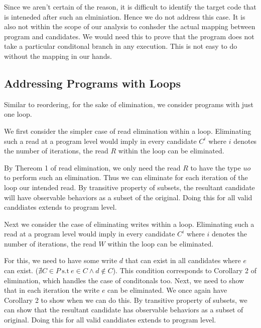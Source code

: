         Since we aren't certain of the reason, it is difficult to identify the target code that is inteneded after such an elminiation. Hence we do not address this case. It is also not within the scope of our analysis to conhsder the actual mapping between program and candidates. We would need this to prove that the program does not take a particular conditonal branch in any execution. This is not easy to do without the mapping in our hands. 


    \subsection{Addressing Programs with Loops}
    
        Similar to reordering, for the sake of elimination, we consider programs with just one loop. 
        
        We first consider the simpler case of read elimination within a loop. 
        Eliminating such a read at a program level would imply in every candidate $C^i$ where $i$ denotes the number of iterations, the read $R$ within the loop can be eliminated.
        
        By Thereom 1 of read elimination, we only need the read $R$ to have the type $uo$ to perform such an elimination.
        Thus we can eliminate for each iteration of the loop our intended read. 
        By transitive property of subsets, the resultant candidate will have observable behaviors as a subset of the original. 
        Doing this for all valid canddiates extends to program level.

        Next we consider the case of eliminating writes within a loop. 
        Eliminating such a read at a program level would imply in every candidate $C^i$ where $i$ denotes the number of iterations, the read $W$ within the loop can be eliminated.

        For this, we need to have some write $d$ that can exist in all candidates where $e$ can exist. ($\nexists C \in P \ \text{s.t} \ e \in C \wedge d \notin C$). This condition corresponds to Corollary 2 of elimination, which handles the case of conditonals too. 
        Next, we need to show that in each iteration the write $e$ can be eliminated. We once again have Corollary 2 to show when we can do this. 
        By transitive property of subsets, we can show that the resultant candidate has observable behaviors as a subset of original. 
        Doing this for all valid canddiates extends to program level.
         

